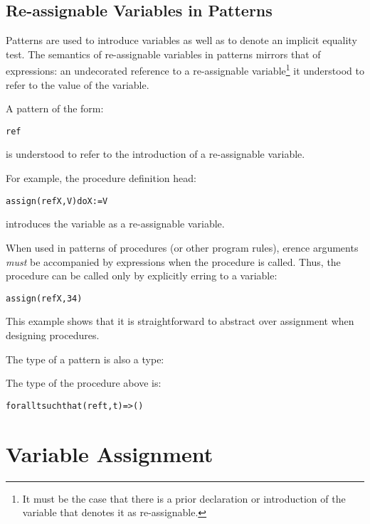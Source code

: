 \subsection{Re-assignable Variables in Patterns}
\label{reVarInPattern}
Patterns are used to introduce variables as well as to denote an implicit equality test. The semantics of re-assignable variables in patterns mirrors that of expressions: an undecorated reference to a re-assignable variable\footnote{It must be the case that there is a prior declaration or introduction of the variable that denotes it as re-assignable.} it understood to refer to the value of the variable.

A pattern of the form:
\begin{alltt}
ref 
\end{alltt}
is understood to refer to the introduction of a re-assignable variable.

For example, the procedure definition head:
\begin{alltt}
assign(ref X,V) do X:=V
\end{alltt}
introduces the variable  as a re-assignable variable. 
\begin{aside}
When used in patterns of procedures (or other program rules), erence arguments \emph{must} be accompanied by  expressions when the procedure is called. Thus, the  procedure can be called only by explicitly erring to a variable:
\begin{alltt}
assign(ref X,34)
\end{alltt}
\begin{aside}
This example shows that it is straightforward to abstract over assignment when designing procedures.
\end{aside}
\end{aside}
The type of a  pattern is also a  type:
\begin{prooftree}
\end{prooftree}
\begin{aside}
The type of the  procedure above is:
\begin{alltt}
for all t such that (ref t,t)=>()
\end{alltt}
\end{aside}

\section{Variable Assignment}
\label{variableAssignment}

